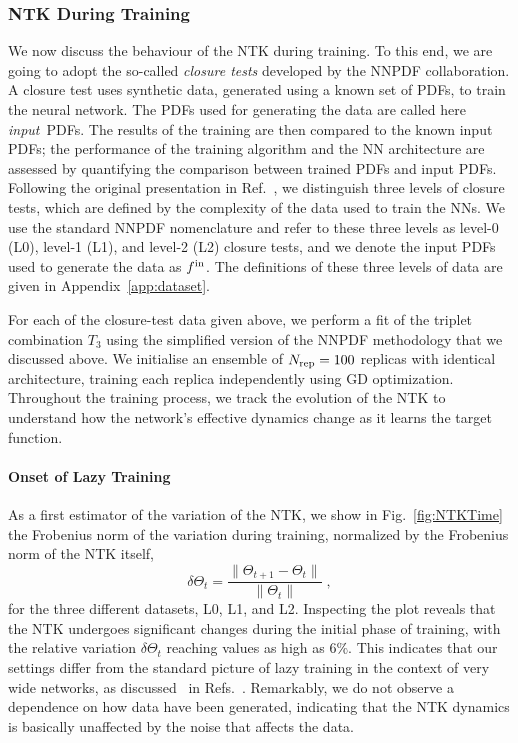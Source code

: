 \FloatBarrier

\subsubsection{NTK During Training}
\label{sec:NTKDuringTraining}

We now discuss the behaviour of the NTK during training. To this end, we are
going to adopt the so-called {\em closure tests} developed by the NNPDF
collaboration. A closure test uses synthetic data, generated using a known set
of PDFs, to train the neural network. The PDFs used for generating the data are
called here {\em input}\ PDFs. The results of the training are then compared to
the known input PDFs; the performance of the training algorithm and the NN
architecture are assessed by quantifying the comparison between trained PDFs and
input PDFs. Following the original presentation in Ref.~\cite{NNPDF:2014otw}, we
distinguish three levels of closure tests, which are defined by the complexity
of the data used to train the NNs. We use the standard NNPDF nomenclature and
refer to these three levels as level-0 (L0), level-1 (L1), and level-2 (L2)
closure tests, and we denote the input PDFs used to generate the data as $f^{\rm in}$.
The definitions of these three levels of data are given in Appendix~\ref{app:dataset}.

For each of the closure-test data given above, we perform a fit of the
triplet combination $T_3$ using the simplified version of the NNPDF methodology that we 
discussed above. We initialise an ensemble of $N_{\rm rep} = 100$ replicas with identical architecture,
training each replica independently using GD optimization. Throughout the
training process, we track the evolution of the NTK to understand how the
network's effective dynamics change as it learns the target function.

\paragraph{Onset of Lazy Training} 

As a first estimator of the variation of the NTK, we show in
Fig.~\ref{fig:NTKTime} the Frobenius norm of the variation during training,
normalized by the Frobenius norm of the NTK itself, 
\begin{equation}
\delta \Theta_t = \frac{\lVert \Theta_{t+1} - \Theta_t \rVert}{\lVert \Theta_t \rVert} \;,
\label{eq:DeltaNTK}
\end{equation}
for the three different datasets, L0, L1, and L2. Inspecting the plot reveals that
the NTK undergoes significant changes during the initial phase of training, with
the relative variation $\delta \Theta_t$ reaching values as high as $6\%$. This
indicates that our settings differ from the standard picture of lazy training in
the context of very wide networks, as discussed \eg~in
Refs.~\cite{jacot2018neural,Roberts:2021fes,lee2019wide}. Remarkably, we do not
observe a dependence on how data have been generated, indicating that the NTK
dynamics is basically unaffected by the noise that affects the data. 

